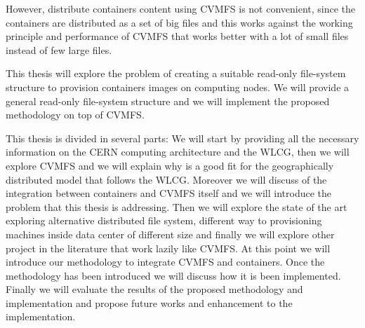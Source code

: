 However, distribute containers content using CVMFS is not convenient, since the
containers are distributed as a set of big files and this works against the
working principle and performance of CVMFS that works better with a lot of
small files instead of few large files.

This thesis will explore the problem of creating a suitable read-only
file-system structure to provision containers images on computing nodes. We
will provide a general read-only file-system structure and we will implement the
proposed methodology on top of CVMFS.

This thesis is divided in several parts: We will start by providing all the
necessary information on the CERN computing architecture and the WLCG, then we
will explore CVMFS and we will explain why is a good fit for the geographically
distributed model that follows the WLCG. Moreover we will discuss of the
integration between containers and CVMFS itself and we will introduce the
problem that this thesis is addressing. Then we will explore the state of the
art exploring alternative distributed file system, different way to
provisioning machines inside data center of different size and finally we will
explore other project in the literature that work lazily like CVMFS. At this
point we will introduce our methodology to integrate CVMFS and containers. Once
the methodology has been introduced we will discuss how it is been implemented.
Finally we will evaluate the results of the proposed methodology and
implementation and propose future works and enhancement to the implementation.

